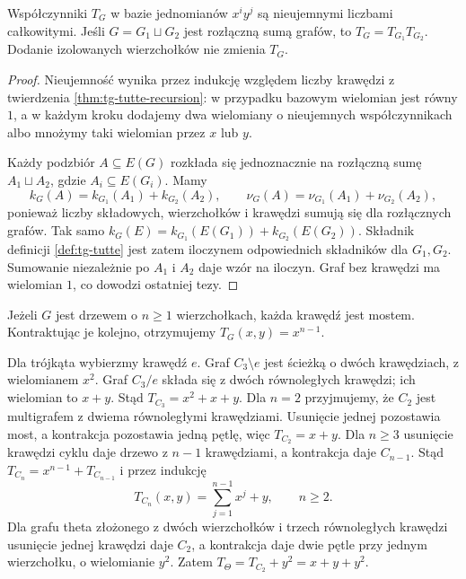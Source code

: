 \begin{wniosek}
\label{cor:tg-tutte-product}
Współczynniki $T_G$ w bazie jednomianów $x^iy^j$
są nieujemnymi liczbami całkowitymi.
Jeśli $G=G_1\sqcup G_2$ jest rozłączną sumą grafów,
to $T_G=T_{G_1}T_{G_2}$.
Dodanie izolowanych wierzchołków nie zmienia $T_G$.
\end{wniosek}
\begin{proof}
Nieujemność wynika przez indukcję względem liczby
krawędzi z twierdzenia \ref{thm:tg-tutte-recursion}:
w przypadku bazowym wielomian jest równy $1$,
a w każdym kroku dodajemy dwa wielomiany o nieujemnych
współczynnikach albo mnożymy taki wielomian przez $x$
lub $y$.

Każdy podzbiór $A\subseteq E(G)$ rozkłada się
jednoznacznie na rozłączną sumę $A_1\sqcup A_2$,
gdzie $A_i\subseteq E(G_i)$. Mamy
\[
k_G(A)=k_{G_1}(A_1)+k_{G_2}(A_2),\qquad
\nu_G(A)=\nu_{G_1}(A_1)+\nu_{G_2}(A_2),
\]
ponieważ liczby składowych, wierzchołków i krawędzi
sumują się dla rozłącznych grafów.
Tak samo $k_G(E)=k_{G_1}(E(G_1))+k_{G_2}(E(G_2))$.
Składnik definicji \ref{def:tg-tutte} jest zatem
iloczynem odpowiednich składników dla $G_1,G_2$.
Sumowanie niezależnie po $A_1$ i $A_2$ daje
wzór na iloczyn. Graf bez krawędzi ma wielomian $1$,
co dowodzi ostatniej tezy.
\end{proof}

\begin{przyklad}
Jeżeli $G$ jest drzewem o $n\ge1$ wierzchołkach,
każda krawędź jest mostem. Kontraktując je kolejno,
otrzymujemy $T_G(x,y)=x^{n-1}$.

Dla trójkąta wybierzmy krawędź $e$.
Graf $C_3\setminus e$ jest ścieżką o dwóch krawędziach,
z wielomianem $x^2$. Graf $C_3/e$ składa się z dwóch
równoległych krawędzi; ich wielomian to $x+y$.
Stąd
$T_{C_3}=x^2+x+y$.
Dla $n=2$ przyjmujemy, że $C_2$ jest multigrafem
z dwiema równoległymi krawędziami. Usunięcie jednej
pozostawia most, a kontrakcja pozostawia jedną pętlę,
więc $T_{C_2}=x+y$. Dla $n\ge3$ usunięcie krawędzi
cyklu daje drzewo z $n-1$ krawędziami, a kontrakcja
daje $C_{n-1}$. Stąd $T_{C_n}=x^{n-1}+T_{C_{n-1}}$
i przez indukcję
\[
 T_{C_n}(x,y)=\sum_{j=1}^{n-1}x^j+y,\qquad n\ge2.
\]
Dla grafu theta złożonego z dwóch wierzchołków
i trzech równoległych krawędzi usunięcie jednej
krawędzi daje $C_2$, a kontrakcja daje dwie pętle
przy jednym wierzchołku, o wielomianie $y^2$.
Zatem $T_{\Theta}=T_{C_2}+y^2=x+y+y^2$.
\end{przyklad}

